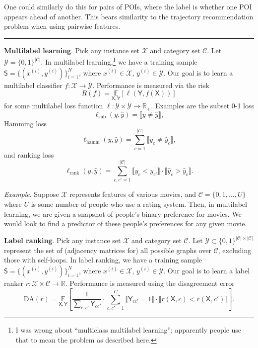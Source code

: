 \documentclass{article}
\newcommand{\indicator}[1]{\llbracket #1 \rrbracket}
\newcommand{\E}[2]{\underset{#1}{\mathbb{E}}\left[ #2 \right]}
\newcommand{\X}{\mathsf{X}}
\newcommand{\Y}{\mathsf{Y}}
\newcommand{\SSf}{\mathsf{S}}
\newcommand{\CCal}{\mathscr{C}}
\newcommand{\XCal}{\mathscr{X}}
\newcommand{\YCal}{\mathscr{Y}}
\newcommand{\Real}{\mathbb{R}}
\begin{document}
One could similarly do this for pairs of POIs, where the label is whether one POI appears ahead of another.
This bears similarity to the trajectory recommendation problem when using pairwise features.


\vspace{12pt}
\hrule
\vspace{12pt}

%
\textbf{Multilabel learning}.
Pick any instance set $\XCal$
and category set $\CCal$.
Let $\YCal = \{ 0, 1 \}^{|\CCal|}$.
In multilabel learning,\footnote{I was wrong about ``multiclass multilabel learning''; apparently people use that to mean the problem as described here.}
we have a training sample $\SSf = \{ ( x^{(i)}, y^{(i)} ) \}_{i = 1}^N$,
where
$x^{(i)} \in \XCal$,
$y^{(i)} \in \YCal$.
Our goal is to learn a multilabel classifier $f \colon \XCal \to \YCal$.
Performance is measured via the risk
$$ R( f ) = \E{\X, \Y}{ \ell( \Y, f( \X ) ) } $$
for some multilabel loss function $\ell \colon \YCal \times \YCal \to \Real_+$.
Examples are the subset 0-1 loss
$$ \ell_{\mathrm{sub}}( y, \hat{y} ) = \indicator{ y \neq \hat{y} }, $$
Hamming loss
$$ \ell_{\mathrm{hamm}}( y, \hat{y} ) = \sum_{c = 1}^{|\CCal|} \indicator{ y_c \neq \hat{y}_c }, $$
and ranking loss
$$ \ell_{\mathrm{rank}}( y, \hat{y} ) = \sum_{c, c' = 1}^{|\CCal|} \indicator{ y_c < y_{c'} } \cdot \indicator{ \hat{y}_c > \hat{y}_c }. $$

\emph{Example}.
Suppose $\XCal$ represents features of various movies, and
$\CCal = \{ 0, 1, \ldots, U \}$ where $U$ is some number of people who use a rating system.
Then, in multilabel learning, we are given a snapshot of people's binary preference for movies.
We would look to find a predictor of these people's preferences for any given movie.


%
\textbf{Label ranking}.
Pick any instance set $\XCal$
and category set $\CCal$.
Let $\YCal \subset \{ 0, 1 \}^{|\CCal| \times |\CCal|}$ represent the set of (adjacency matrices for) all possible graphs over $\CCal$, excluding those with self-loops.
In label ranking,
we have a training sample $\SSf = \{ ( x^{(i)}, y^{(i)} ) \}_{i = 1}^N$,
where
$x^{(i)} \in \XCal$,
$y^{(i)} \in \YCal$.
Our goal is to learn a label ranker $r \colon \XCal \times \CCal \to \Real$.
Performance is measured using the disagreement error
$$ \mathrm{DA}( r ) = \E{\X, \Y}{ \frac{1}{\sum_{c, c'} \Y_{c c'}} \cdot \sum_{c, c' = 1}^{C} \indicator{\Y_{c c'} = 1} \cdot \indicator{ r( \X, c ) < r( \X, c' ) } }. $$
\end{document}
